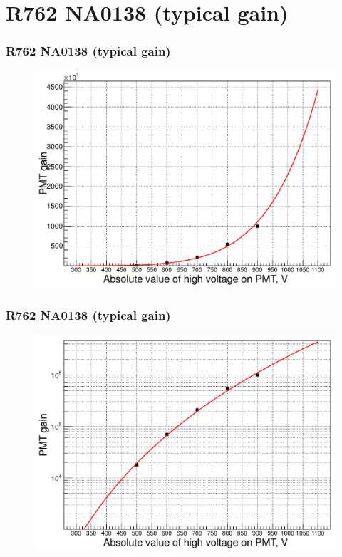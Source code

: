 \documentclass{beamer}
\begin{document}
\section{R762 NA0138 (typical gain)}
\begin{frame}
\frametitle{R762 NA0138 (typical gain)}
\begin{figure}
  \includegraphics[width=0.95\linewidth]{./pmtTypicalGainR762_NA0138.pdf}
\end{figure}
\end{frame}
\begin{frame}
\frametitle{R762 NA0138 (typical gain)}
\begin{figure}
    \includegraphics[width=0.95\linewidth]{./pmtTypicalGainR762_NA0138_log.pdf}
\end{figure}
\end{frame}
\end{document}
